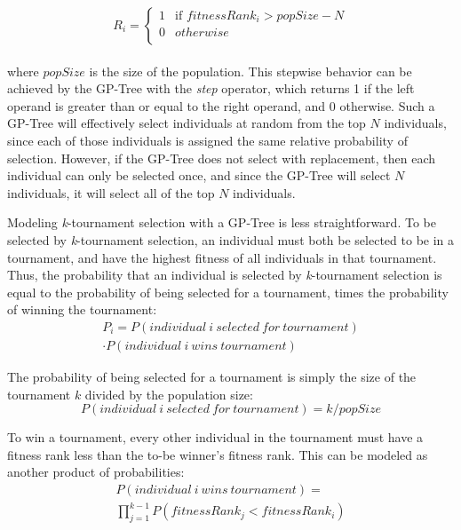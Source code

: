 \documentclass[sigconf]{acmart}
\begin{document}
\begin{equation}
  R_i =
  \begin{cases}
    1 & \text{if $fitnessRank_i > popSize-N$} \\
    0 & \text{$otherwise$} \\
  \end{cases}
\end{equation}
\\

\noindent where $popSize$ is the size of the population. This stepwise behavior can be achieved by the GP-Tree with the \textit{step} operator, which returns 1 if the left operand is greater than or equal to the right operand, and 0 otherwise. Such a GP-Tree will effectively select individuals at random from the top $N$ individuals, since each of those individuals is assigned the same relative probability of selection. However, if the GP-Tree does not select with replacement, then each individual can only be selected once, and since the GP-Tree will select $N$ individuals, it will select all of the top $N$ individuals.

Modeling \textit{k}-tournament selection with a GP-Tree is less straightforward. To be selected by \textit{k}-tournament selection, an individual must both be selected to be in a tournament, and have the highest fitness of all individuals in that tournament. Thus, the probability that an individual is selected by \textit{k}-tournament selection is equal to the probability of being selected for a tournament, times the probability of winning the tournament:
\begin{equation}
\begin{aligned}
	P_i = P(individual\ i\ selected\ for\ tournament)\\ \cdot P(individual\ i\ wins\ tournament)
\end{aligned}
\end{equation}

The probability of being selected for a tournament is simply the size of the tournament $k$ divided by the population size: 
\begin{equation} \label{eq:probabilitySelectedForTournament}
	P(individual\ i\ selected\ for\ tournament) = k / popSize
\end{equation}

To win a tournament, every other individual in the tournament must have a fitness rank less than the to-be winner's fitness rank. This can be modeled as another product of probabilities:
\begin{equation} 
\begin{aligned}
	P(individual\ i\ wins\ tournament) =\\ \prod_{j=1}^{k-1} P(fitnessRank_j < fitnessRank_i)
\end{aligned}
\end{equation}
\end{document}
